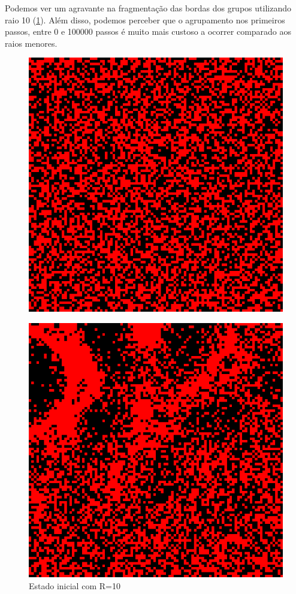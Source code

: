 \documentclass[conference]{IEEEtran}
\begin{document}
Podemos ver um agravante na fragmentação das bordas dos grupos utilizando raio 10 (\ref{fig:r10}). Além disso, podemos perceber que o agrupamento nos primeiros passos, entre 0 e 100000 passos é muito mais custoso a ocorrer comparado aos raios menores.


\begin{figure}[h!] 
  \begin{minipage}[b]{0.5\linewidth}
    \label{fig:r10}
    \centering
    \includegraphics[width=.8\linewidth]{resultados/10-0.png} 
    \caption{Estado inicial com R=10} 
    \vspace{4ex}
  \end{minipage}%
  \begin{minipage}[b]{0.5\linewidth}
    \centering
    \includegraphics[width=.8\linewidth]{resultados/10-1.png} 

\end{minipage}
\end{figure}
\end{document}
